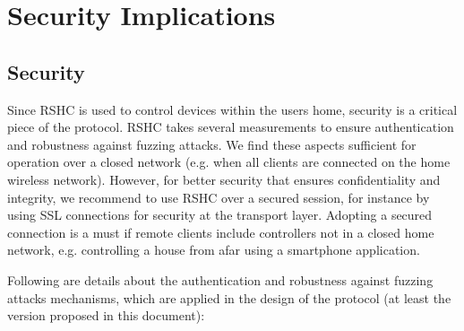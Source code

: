 \section{Security Implications}
\label{sec:security}

\subsection{Security}
\label{sec:security:sec}

Since RSHC is used to control devices within the users home, security is a critical piece of the protocol. RSHC takes several measurements to ensure authentication and robustness against fuzzing attacks. We find these aspects sufficient for operation over a closed network (e.g. when all clients are connected on the home wireless network). However, for better security that ensures confidentiality and integrity, we recommend to use RSHC over a secured session, for instance by using SSL connections for security at the transport layer. Adopting a secured connection is a must if remote clients include controllers not in a closed home network, e.g. controlling a house from afar using a smartphone application.

Following are details about the authentication and robustness against fuzzing attacks mechanisms, which are applied in the design of the protocol (at least the version proposed in this document):

